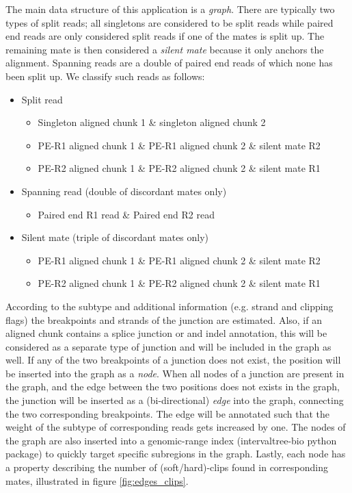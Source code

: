 \documentclass{article}
\theoremstyle{definition}
\begin{document}
The main data structure of this application is a \textit{graph}. There are typically two types of split reads; all singletons are considered to be split reads while paired end reads are only considered split reads if one of the mates is split up.
The remaining mate is then considered a \textit{silent mate} because it only anchors the alignment.
Spanning reads are a double of paired end reads of which none has been split up.
We classify such reads as follows:
\begin{itemize}
	\item Split read
	\begin{itemize}
		\item Singleton aligned chunk 1 \& singleton aligned chunk 2
		\item PE-R1 aligned chunk 1 \& PE-R1 aligned chunk 2 \& silent mate R2
		\item PE-R2 aligned chunk 1 \& PE-R2 aligned chunk 2 \& silent mate R1
	\end{itemize}
	\item Spanning read (double of discordant mates only)
	\begin{itemize}
		\item Paired end R1 read \& Paired end R2 read
	\end{itemize}
	\item Silent mate (triple of discordant mates only)
	\begin{itemize}
		\item PE-R1 aligned chunk 1 \& PE-R1 aligned chunk 2 \& silent mate R2
		\item PE-R2 aligned chunk 1 \& PE-R2 aligned chunk 2 \& silent mate R1
	\end{itemize}
\end{itemize}
According to the subtype and additional information (e.g. strand and clipping flags) the breakpoints and strands of the junction are estimated.
Also, if an aligned chunk contains a splice junction or and indel annotation, this will be considered as a separate type of junction and will be included in the graph as well.
If any of the two breakpoints of a junction does not exist, the position will be inserted into the graph as a \textit{node}.
When all nodes of a junction are present in the graph, and the edge between the two positions does not exists in the graph, the junction will be inserted as a (bi-directional) \textit{edge} into the graph, connecting the two corresponding breakpoints.
The edge will be annotated such that the weight of the subtype of corresponding reads gets increased by one.
The nodes of the graph are also inserted into a genomic-range index (intervaltree-bio python package) to quickly target specific subregions in the graph.
Lastly, each node has a property describing the number of (soft/hard)-clips found in corresponding mates, illustrated in figure \ref{fig:edges_clips}.
\end{document}
